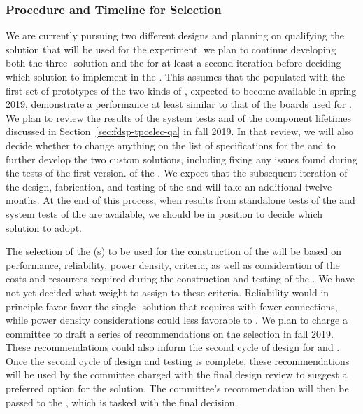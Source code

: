 \subsubsection{Procedure and Timeline for  Selection}
\label{sec:fdsp-tpcelec-design-femb-selection}

We are currently pursuing two different  designs and 
planning on qualifying the   solution that 
will be used for the  experiment.
we plan to continue developing both the three- 
solution and the   for at least a second 
iteration before deciding which  solution to 
implement in the  . This assumes that 
the  populated with the first set of prototypes of 
the two kinds of , expected to become available in 
spring 2019, demonstrate a performance at least similar to that 
of the boards used for . We plan to review the results 
of the system tests and of the component lifetimes discussed 
in Section~\ref{sec:fdsp-tpcelec-qa} in fall 2019. 
In that review, we will also decide whether to change anything on 
the list of specifications for the  and to further develop
the two custom  solutions, including fixing any 
issues found during the tests of the first version.  of the . 
We expect that the subsequent iteration
of the design, fabrication, and testing of the  and
 will take an additional twelve months. At the end 
of this process, when results from standalone tests of the
 and system tests of the  are
available, we should be in position to decide which 
solution to adopt.

The selection of the (s) to be used for the
construction of the   will be
based on performance, reliability, power density, 
criteria, as well as consideration of the costs and
resources required during the construction and testing
of the . We have not yet decided what weight 
to assign to these criteria. Reliability would in principle favor
favor the single- solution that requires 
 with fewer connections, while power 
density considerations could less favorable to .
We plan to charge a committee to draft a series of recommendations 
on the  selection in fall
2019. These recommendations could also inform the second cycle of design for
 and . Once the second cycle of design
and testing is complete, these recommendations will be used by the
committee charged with the final design review to suggest a
preferred option for the  solution.
The committee's recommendation 
will then be passed to the  , 
which is tasked with the final  decision.

